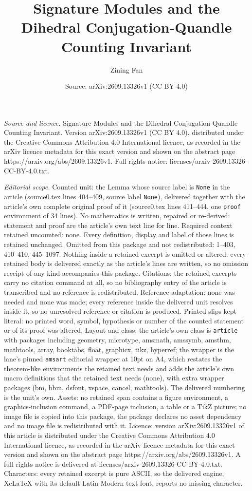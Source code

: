 \documentclass[10pt,a4paper]{amsart}
\title[Signature Modules and the Dihedral Conjugation-Quandle Count]{Signature Modules and the Dihedral Conjugation-Quandle Counting Invariant}
\author{Zining Fan}
\date{Source: arXiv:2609.13326v1 (CC BY 4.0)}
\begin{document}
\maketitle

\noindent\emph{Source and licence.} Signature Modules and the Dihedral Conjugation-Quandle Counting Invariant. Version arXiv:2609.13326v1 (CC BY 4.0), distributed under the Creative Commons Attribution 4.0 International licence, as recorded in the arXiv licence metadata for this exact version and shown on the abstract page https://arxiv.org/abs/2609.13326v1. Full rights notice: licenses/arxiv-2609.13326-CC-BY-4.0.txt.\par\smallskip

\noindent\textit{Editorial scope.} Counted unit: the Lemma whose source label is \texttt{None} in the article (source0.tex lines 404--409, source label \texttt{None}), delivered together with the article's own complete original proof of it (source0.tex lines 411--444, one \texttt{proof} environment of 34 lines). No mathematics is written, repaired or re-derived: statement and proof are the article's own text line for line. Required context retained uncounted: none. Every definition, display and label of those lines is retained unchanged. Omitted from this package and not redistributed: 1--403, 410--410, 445--1097. Nothing inside a retained excerpt is omitted or altered: every retained body is delivered exactly as the article's lines are written, so no omission receipt of any kind accompanies this package. Citations: the retained excerpts carry no citation command at all, so no bibliography entry of the article is transcribed and no reference is redistributed. Reference adaptation: none was needed and none was made; every reference inside the delivered unit resolves inside it, so no unresolved reference or citation is produced. Printed slips kept literal: no printed word, symbol, hypothesis or number of the counted statement or of its proof was altered. Layout and class: the article's own class is \texttt{article} with packages including geometry, microtype, amsmath, amssymb, amsthm, mathtools, array, booktabs, float, graphicx, tikz, hyperref; the wrapper is the lane's pinned \texttt{amsart} editorial wrapper at 10pt on A4, which restates the theorem-like environments the retained text needs and adds the article's own macro definitions that the retained text needs (none), with extra wrapper packages (bm, bbm, dsfont, xspace, cancel, mathtools). The delivered numbering is the unit's own. Assets: no retained span contains a figure environment, a graphics-inclusion command, a PDF-page inclusion, a table or a TikZ picture; no image file is copied into this package, the package declares no asset dependency and no image file is redistributed with it. Licence: version arXiv:2609.13326v1 of this article is distributed under the Creative Commons Attribution 4.0 International licence, as recorded in the arXiv licence metadata for this exact version and shown on the abstract page https://arxiv.org/abs/2609.13326v1. A full rights notice is delivered at licenses/arxiv-2609.13326-CC-BY-4.0.txt. Characters: every retained excerpt is pure ASCII, so the delivered engine, XeLaTeX with its default Latin Modern text font, reports no missing character.
\end{document}
